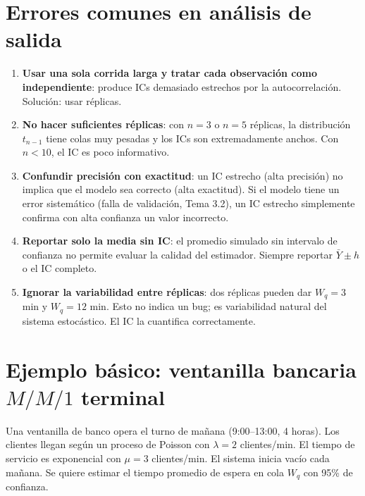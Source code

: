 \documentclass[11pt, letterpaper]{article}
\begin{document}
\section{Errores comunes en análisis de salida}

\begin{enumerate}
    \item \textbf{Usar una sola corrida larga y tratar cada observación como independiente}: produce ICs demasiado estrechos por la autocorrelación. Solución: usar réplicas.

    \item \textbf{No hacer suficientes réplicas}: con $n=3$ o $n=5$ réplicas, la distribución $t_{n-1}$ tiene colas muy pesadas y los ICs son extremadamente anchos. Con $n<10$, el IC es poco informativo.

    \item \textbf{Confundir precisión con exactitud}: un IC estrecho (alta precisión) no implica que el modelo sea correcto (alta exactitud). Si el modelo tiene un error sistemático (falla de validación, Tema 3.2), un IC estrecho simplemente confirma con alta confianza un valor incorrecto.

    \item \textbf{Reportar solo la media sin IC}: el promedio simulado sin intervalo de confianza no permite evaluar la calidad del estimador. Siempre reportar $\bar Y \pm h$ o el IC completo.

    \item \textbf{Ignorar la variabilidad entre réplicas}: dos réplicas pueden dar $W_q = 3$ min y $W_q = 12$ min. Esto no indica un bug; es variabilidad natural del sistema estocástico. El IC la cuantifica correctamente.
\end{enumerate}

\section{Ejemplo básico: ventanilla bancaria $M/M/1$ terminal}

\begin{ejemplobox}[Sistema]
Una ventanilla de banco opera el turno de mañana (9:00--13:00, 4 horas). Los clientes llegan según un proceso de Poisson con $\lambda=2$ clientes/min. El tiempo de servicio es exponencial con $\mu=3$ clientes/min. El sistema inicia vacío cada mañana. Se quiere estimar el tiempo promedio de espera en cola $W_q$ con 95\% de confianza.
\end{ejemplobox}
\end{document}
